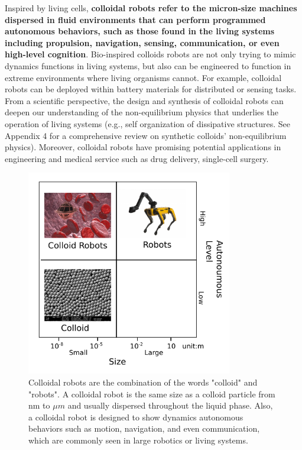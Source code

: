 Inspired by living cells, \textbf{colloidal robots refer to the micron-size machines  dispersed in fluid environments that can perform  programmed autonomous behaviors, such as those found in the living systems including propulsion, navigation, sensing, communication, or even high-level cognition}. Bio-inspired colloids robots are not only trying to mimic dynamics functions in living systems, but also can be engineered to function in extreme environments where living organisms cannot. For example, colloidal robots can be deployed within battery materials for distributed or sensing tasks. From a scientific perspective, the design and synthesis of colloidal robots can deepen our understanding of the non-equilibrium physics that underlies the operation of living systems (e.g., self organization of dissipative structures. See Appendix 4 for a comprehensive review on  synthetic colloids' non-equilibrium physics). Moreover, colloidal robots have promising potential applications in engineering and medical service such as drug delivery\autocite{fu2012controlled,de2017micromotor}, single-cell surgery\autocite{li2017micro}. 

\begin{figure}
\centering
\includegraphics[width=9cm]{figures/1_1.pdf}
\caption{Colloidal robots are the combination of the words "colloid" and "robots". A colloidal robot is the same size as a colloid particle from nm to $\mu m$ and usually dispersed throughout the liquid phase. Also, a colloidal robot is designed to show dynamics autonomous behaviors such as motion, navigation, and even communication, which are commonly seen in large robotics or living systems.}
\label{fig:1.1}
\end{figure}


